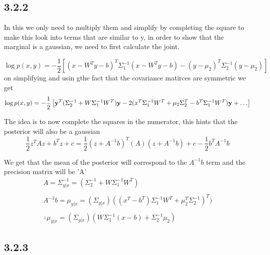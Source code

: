 \subsection{3.2.2}
In this we only need to multiply them and simplify by completing the square
to make this look into terms that are similar to y, in order to show that the marginal is a gaussian, we need to first calculate the joint.

\begin{equation}
   \log p(x, y) = -\frac{1}{2} \left [(x - W^Ty - b)^T \Sigma_1^{-1} (x - W^Ty - b) - (y - \mu_2)^T\Sigma_2^{-1}(y - \mu_2) \right]
\end{equation}
on simplifying and usin gthe fact that the covariance matirces are symmetric we get
\begin{equation}
   \log p(x, y) = -\frac{1}{2} \left [\vb{y}^T(\Sigma_2^{-1} + W \Sigma_1^{-1} W^T)\vb{y} -2(x^T\Sigma_1^{-1} W^T + \mu_2 \Sigma_2^T  - b^T\Sigma_1^{-1}W^T)\vb{y} + \ldots \right]
\end{equation}

The idea is to now complete the squares in the numerator, this hints that the posterior will also be a gaussian
\begin{equation}
    \frac{1}{2} z^T A z  + b^Tz + c = \frac{1}{2}(z + A^{-1}b)^T(A)(z + A^{-1}b) + c - \frac{1}{2}b^TA^{-1}b
\end{equation}

We get that the mean of the posterior will correspond to the $A^{-1}b $ term and the precision matrix  will be 'A'
\begin{gather*}
    \boxed{A    = \Sigma_{y|x}^{-1} = (\Sigma_2^{-1} + W \Sigma_1^{-1} W^T)}
    \\
    \\
    {A^{-1}b = \mu_{y|x} = (\Sigma_{y|x})((x^T - b^T)\Sigma_1^{-1} W^T + \mu_2^T \Sigma_2^{-1})^T)}
    \\
    \\
    \therefore \boxed{\mu_{y|x} = (\Sigma_{y|x})(W\Sigma_1^{-1}(x - b) + \Sigma_2^{-1} \mu_2)}
\end{gather*}

\subsection{3.2.3}

